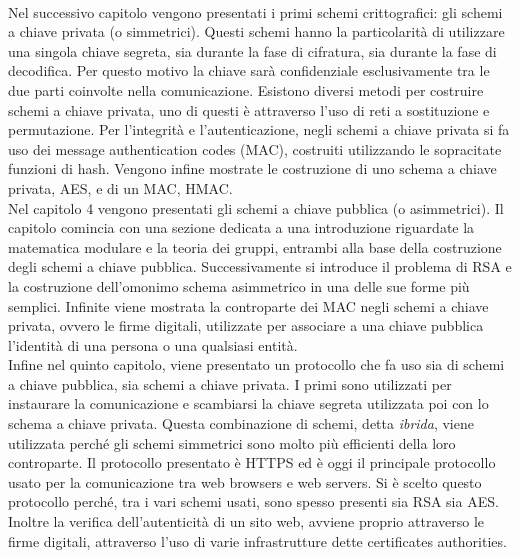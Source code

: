 \\
Nel successivo capitolo vengono presentati i primi schemi crittografici: gli schemi a chiave privata (o simmetrici). Questi schemi hanno la particolarità di utilizzare una singola chiave segreta, sia durante la fase di cifratura, sia durante la fase di decodifica. Per questo motivo la chiave sarà confidenziale esclusivamente tra le due parti coinvolte nella comunicazione. Esistono diversi metodi per costruire schemi a chiave privata, uno di questi è attraverso l'uso di reti a sostituzione e permutazione. Per l'integrità e l'autenticazione, negli schemi a chiave privata si fa uso dei message authentication codes (MAC), costruiti utilizzando le sopracitate funzioni di hash. Vengono infine mostrate le costruzione di uno schema a chiave privata, AES, e di un MAC, HMAC.
\\
Nel capitolo 4 vengono presentati gli schemi a chiave pubblica (o asimmetrici). Il capitolo comincia con una sezione dedicata a una introduzione riguardate la matematica modulare e la teoria dei gruppi, entrambi alla base della costruzione degli schemi a chiave pubblica. Successivamente si introduce il problema di RSA e la costruzione dell'omonimo schema asimmetrico in una delle sue forme più semplici. Infinite viene mostrata la controparte dei MAC negli schemi a chiave privata, ovvero le firme digitali, utilizzate per associare a una chiave pubblica l'identità di una persona o una qualsiasi entità.
\\
Infine nel quinto capitolo, viene presentato un protocollo che fa uso sia di schemi a chiave pubblica, sia schemi a chiave privata. I primi sono utilizzati per instaurare la comunicazione e scambiarsi la chiave segreta utilizzata poi con lo schema a chiave privata. Questa combinazione di schemi, detta \emph{ibrida}, viene utilizzata perché gli schemi simmetrici sono molto più efficienti della loro controparte. Il protocollo presentato è HTTPS ed è oggi il principale protocollo usato per la comunicazione tra web browsers e web servers. Si è scelto questo protocollo perché, tra i vari schemi usati, sono spesso presenti sia RSA sia AES. Inoltre la verifica dell'autenticità di un sito web, avviene proprio attraverso le firme digitali, attraverso l'uso di varie infrastrutture dette certificates authorities.
